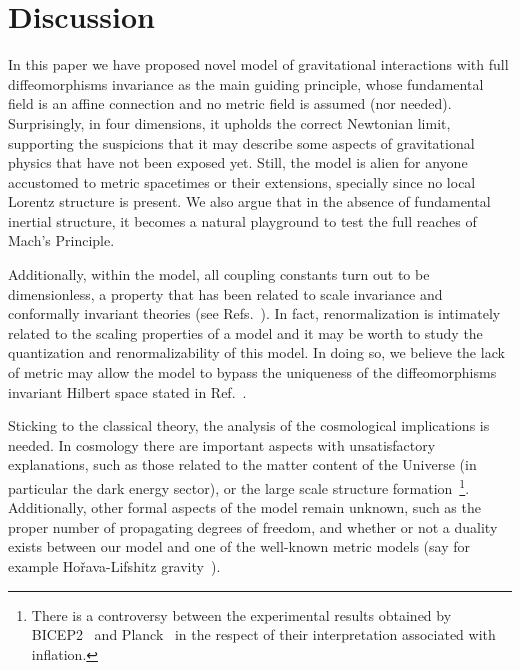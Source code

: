 \documentclass[twocolumn,aps,
  showpacs,showkeys,prd,superscriptaddress]{revtex4-1}
\renewcommand{\(}{\left(}
\renewcommand{\)}{\right)}
\renewcommand{\[}{\left[}
\renewcommand{\]}{\right]}
\begin{document}
\section{\label{sec:dis} Discussion}

In this paper we have proposed novel model of gravitational interactions with full diffeomorphisms invariance as the main guiding principle, whose fundamental field is an affine connection and no metric field is assumed (nor needed). Surprisingly, in four dimensions, it upholds the correct Newtonian limit, supporting the suspicions that it may describe some aspects of gravitational physics that have not been exposed yet. Still, the model is alien for anyone accustomed to metric spacetimes or their extensions, specially since no local Lorentz structure is present. We also argue that in the absence of fundamental inertial structure, it becomes a natural playground to test the full reaches of Mach's Principle.

Additionally, within the model, all coupling constants turn out to be dimensionless, a property that has been related to scale invariance and conformally invariant theories (see Refs.~\cite{Buchholz:1976hz,Maldacena:2011mk}). In fact, renormalization is intimately related to the scaling properties of a model and it may be worth to study the quantization and renormalizability of this  model. In doing so, we believe the lack of metric may allow the model to bypass the uniqueness of the diffeomorphisms invariant Hilbert space stated in Ref.~\cite{Lewandowski:2005jk}.

Sticking to the classical theory, the analysis of the cosmological implications is needed. In cosmology there are important aspects with unsatisfactory explanations, such as those related to the matter content of the Universe (in particular the dark energy sector), or the large scale structure formation~\footnote{There is a controversy between the experimental results obtained by BICEP2~\cite{Ade:2014xna} and Planck~\cite{Adam:2014bub} in the respect of their interpretation associated with inflation.}. Additionally, other formal aspects of the model remain unknown, such as the proper number of propagating degrees of freedom, and whether or not a duality exists between our model and one of the well-known metric models (say for example Ho\v{r}ava-Lifshitz gravity~\cite{Horava:2009uw,*Sotiriou:2010wn}).
\end{document}

